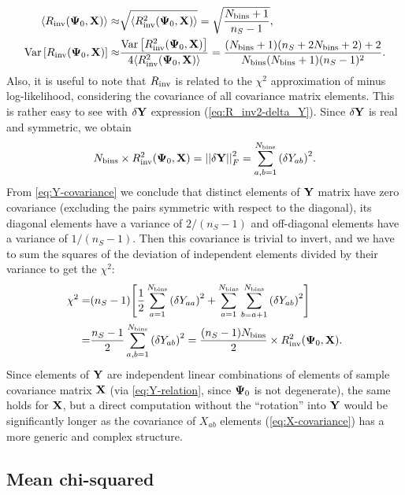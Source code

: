\begin{align} \label{eq:R_inv-expectation}
{\left\langle R_{\rm inv} {\left( {\bf \Psi}_0, {\bf X} \right)} \right\rangle} \approx & \sqrt{{\left\langle R_{\rm inv}^2 {\left( {\bf \Psi}_0, {\bf X} \right)} \right\rangle}} = \sqrt{\frac{N_{\rm bins}+1}{n_S-1}}, \\ \label{eq:R_inv-variance}
\operatorname{Var} {\left[ R_{\rm inv} {\left( {\bf \Psi}_0, {\bf X} \right)} \right]} \approx & \frac{\operatorname{Var} {\left[ R_{\rm inv}^2 {\left( {\bf \Psi}_0, {\bf X} \right)} \right]}}{4{\left\langle R_{\rm inv}^2 {\left( {\bf \Psi}_0, {\bf X} \right)} \right\rangle}} = \frac{(N_{\rm bins} + 1) (n_S + 2 N_{\rm bins} + 2) + 2}{N_{\rm bins} (N_{\rm bins}+1) (n_S-1)^2}.
\end{align}
Also, it is useful to note that $R_{\rm inv}$ is related to the $\chi^2$ approximation of minus log-likelihood, considering the covariance of all covariance matrix elements.
This is rather easy to see with ${\bf \delta Y}$ expression (\cref{eq:R_inv2-delta_Y}).
Since ${\bf \delta Y}$ is real and symmetric, we obtain
\begin{equation}
N_{\rm bins} \times R_{\rm inv}^2 {\left( {\bf \Psi}_0, {\bf X} \right)} = {\left| {\left| \bf \delta Y \right|} \right|}^2_F = \sum_{a,b=1}^{N_{\rm bins}} {\left( \delta Y_{ab} \right)}^2.
\end{equation}
From \cref{eq:Y-covariance} we conclude that distinct elements of $\bf Y$ matrix have zero covariance (excluding the pairs symmetric with respect to the diagonal), its diagonal elements have a variance of $2/(n_S-1)$ and off-diagonal elements have a variance of $1/(n_S-1)$.
Then this covariance is trivial to invert, and we have to sum the squares of the deviation of independent elements divided by their variance to get the $\chi^2$:
\begin{align}
\chi^2 =& {\left( n_S-1 \right)} {\left[ \frac12 \sum_{a=1}^{N_{\rm bins}} {\left( \delta Y_{aa} \right)}^2 + \sum_{a=1}^{N_{\rm bins}} \sum_{b=a+1}^{N_{\rm bins}} {\left( \delta Y_{ab} \right)}^2 \right]} \nonumber \\
=& \frac{n_S-1}2 \sum_{a,b=1}^{N_{\rm bins}} {\left( \delta Y_{ab} \right)}^2 = \frac{{\left( n_S-1 \right)} N_{\rm bins}}2 \times R_{\rm inv}^2 {\left( {\bf \Psi}_0, {\bf X} \right)}.
\end{align}
Since elements of $\bf Y$ are independent linear combinations of elements of sample covariance matrix $\bf X$ (via \cref{eq:Y-relation}, since ${\bf \Psi}_0$ is not degenerate), the same holds for $\bf X$, but a direct computation without the ``rotation'' into $\bf Y$ would be significantly longer as the covariance of $X_{ab}$ elements (\cref{eq:X-covariance}) has a more generic and complex structure.

\subsection{Mean chi-squared}
\label{subsec:chi2}

